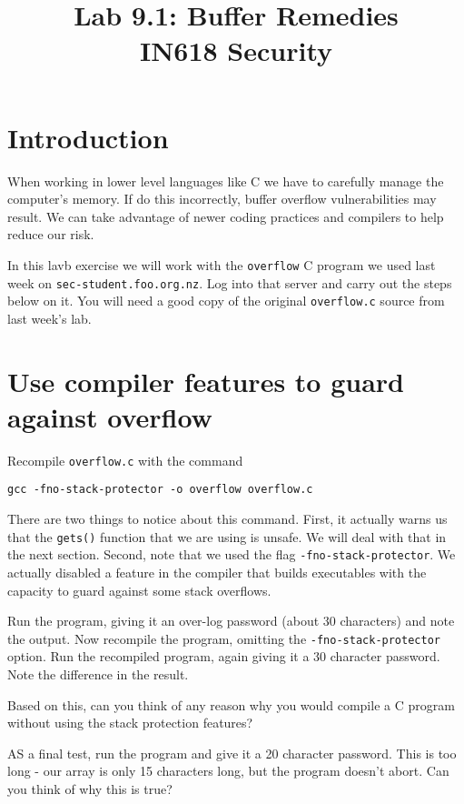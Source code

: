 \documentclass{article}
\begin{document}
\title{ Lab 9.1: Buffer Remedies \\ IN618 Security}
\maketitle

\section*{Introduction}
When working in lower level languages like C we have to carefully manage the computer's memory. If do this incorrectly, buffer overflow vulnerabilities may result. We can take advantage of newer coding practices and compilers to help reduce our risk.

In this lavb exercise we will work with the \texttt{overflow} C program we used last week on \texttt{sec-student.foo.org.nz}.  Log into that server and carry out the steps below on it. You will need a good copy of the original \texttt{overflow.c} source from last week's lab.

\section{Use compiler features to guard against overflow}

Recompile \texttt{overflow.c} with the command

\texttt{gcc -fno-stack-protector -o overflow overflow.c}

There are two things to notice about this command.  First, it actually warns us that the \texttt{gets()} function that we are using is unsafe. We will deal with that in the next section.  Second, note that we used the flag \texttt{-fno-stack-protector}. We actually disabled a feature in the compiler that builds executables with the capacity to guard against some stack overflows.

Run the program, giving it an over-log password (about 30 characters) and note the output. Now recompile the program, omitting the \texttt{-fno-stack-protector} option. Run the recompiled program, again giving it a 30 character password.  Note the difference in the result.

Based on this, can you think of any reason why you would compile a C program without using the stack protection features?

AS a final test, run the program and give it a 20 character password.  This is too long - our array is only 15 characters long, but the program doesn't abort.  Can you think of why this is true?
\end{document}
